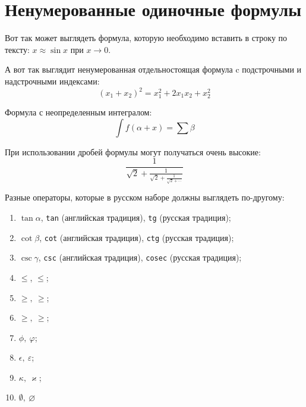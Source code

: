\documentclass{cmcmsuthesis-phd}
\begin{document}
\section{Ненумерованные одиночные формулы}
\label{subsec:ch1/sec3/sub1}
Вот так может выглядеть формула, которую необходимо вставить в строку по тексту: \(x \approx \sin x\) при \(x \to 0\).

А вот так выглядит ненумерованная отдельностоящая формула c подстрочными и надстрочными индексами:
\[(x_1+x_2)^2 = x_1^2 + 2 x_1 x_2 + x_2^2\]

Формула с неопределенным интегралом:
\[\int f(\alpha+x)=\sum\beta\]

При использовании дробей формулы могут получаться очень высокие:
\[\frac{1}{\sqrt{2}+
        \displaystyle\frac{1}{\sqrt{2}+
            \displaystyle\frac{1}{\sqrt{2}+\cdots}}}\]

Разные операторы, которые в русском наборе должны выглядеть по-другому:
\begin{enumerate}
\item \(\tan\alpha\), \texttt{tan} (английская традиция), \texttt{tg} (русская традиция);
\item \(\cot\beta\), \texttt{cot} (английская традиция), \texttt{ctg} (русская традиция);
\item \(\csc\gamma\), \texttt{csc} (английская традиция), \texttt{cosec} (русская традиция);
\item \(\le\), \(\leqslant\);
\item \(\ge,\ \geqslant\);
\item \(\geq,\ \geqslant\);
\item \(\phi,\ \varphi\);
\item \(\epsilon,\ \varepsilon\);
\item \(\kappa,\ \varkappa\);
\item \(\emptyset,\ \varnothing\)
\end{enumerate}
\end{document}
